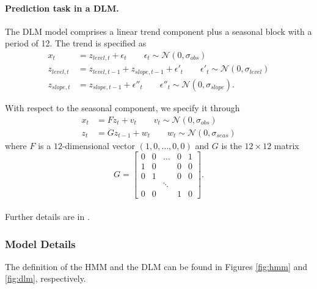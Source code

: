 \paragraph{Prediction task in a DLM.}
The DLM model comprises a linear trend component plus a seasonal block with a period of 12. The trend is specified as
\begin{align*}
x_t &= z_{level,t} + \epsilon_t \qquad \epsilon_t \sim \mathcal{N}(0, \sigma_{obs}) \\
z_{level,t} &= z_{level,t-1} + z_{slope,t-1} + \epsilon'_t \qquad \epsilon'_t \sim \mathcal{N}(0, \sigma_{level}) \\
z_{slope,t} &= z_{slope,t-1} + \epsilon''_t \qquad \epsilon''_t \sim \mathcal{N}(0, \sigma_{slope}).
\end{align*}

With respect to the seasonal component,
we specify it through
\begin{align*}
x_t &= F z_t + v_t \qquad v_t \sim \mathcal{N}(0, \sigma_{obs})\\
z_t &= G z_{t-1} + w_t \qquad w_t \sim \mathcal{N}(0, \sigma_{seas})
\end{align*}
where $F$ is a $12$-dimensional vector
$( 1,0,\ldots, 0,0)$ 
and $G$ is the $12\times 12$ matrix 
\begin{equation*}
G = \begin{bmatrix}
0 & 0 & \ldots & 0 & 1 \\
1 &	0 & & 0 & 0 \\
0 & 1 & & 0 & 0 \\
 & & \ddots & & \\
 0 & 0 & & 1 & 0
\end{bmatrix}.
\end{equation*}
\\

Further details are in \cite{west1998bayesian}.
\iffalse
\subsubsection{Model Details} The definition of the HMM and the DLM can be found in Figures \ref{fig:hmm} and \ref{fig:dlm}, respectively.

